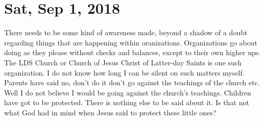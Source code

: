 \section{Sat, Sep 1, 2018}

There needs to be some kind of awareness made, beyond a shadow of a doubt regarding
things that are happening within oranizations. Organizations go about doing as they
please without checks and balances, except to their own higher ups. The LDS Church or
Church of Jesus Christ of Latter-day Saints is one such organization. I do not know
how long I can be silent on such matters myself. Parents have said no, don't do it
don't go against the teachings of the church etc. Well I do not believe I would be
going against the church's teachings. Children have got to be protected. There is
nothing else to be said about it. Is that not what God had in mind when Jesus said to
protect these little ones?